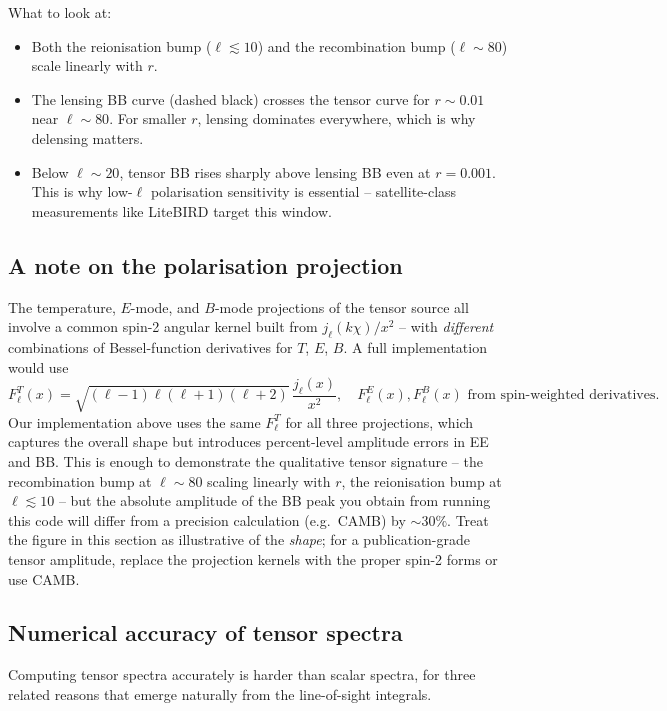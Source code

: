 What to look at:
\begin{itemize}
  \item Both the reionisation bump ($\ell \lesssim 10$) and the recombination bump ($\ell \sim 80$) scale linearly with $r$.
  \item The lensing BB curve (dashed black) crosses the tensor curve for $r \sim 0.01$ near $\ell \sim 80$. For smaller $r$, lensing dominates everywhere, which is why delensing matters.
  \item Below $\ell \sim 20$, tensor BB rises sharply above lensing BB even at $r = 0.001$. This is why low-$\ell$ polarisation sensitivity is essential -- satellite-class measurements like LiteBIRD target this window.
\end{itemize}

\subsection{A note on the polarisation projection}

The temperature, $E$-mode, and $B$-mode projections of the tensor source all involve a common spin-2 angular kernel built from $j_\ell(k\chi)/x^2$ -- with \emph{different} combinations of Bessel-function derivatives for $T$, $E$, $B$. A full implementation would use
\[
  F^T_\ell(x) = \sqrt{(\ell - 1)\ell(\ell + 1)(\ell + 2)}\,\frac{j_\ell(x)}{x^2},
  \quad
  F^E_\ell(x), F^B_\ell(x) \text{ from spin-weighted derivatives.}
\]
Our implementation above uses the same $F^T_\ell$ for all three projections, which captures the overall shape but introduces percent-level amplitude errors in EE and BB. This is enough to demonstrate the qualitative tensor signature -- the recombination bump at $\ell \sim 80$ scaling linearly with $r$, the reionisation bump at $\ell \lesssim 10$ -- but the absolute amplitude of the BB peak you obtain from running this code will differ from a precision calculation (e.g.\ CAMB) by $\sim 30\%$. Treat the figure in this section as illustrative of the \emph{shape}; for a publication-grade tensor amplitude, replace the projection kernels with the proper spin-2 forms or use CAMB.

\subsection{Numerical accuracy of tensor spectra}

Computing tensor spectra accurately is harder than scalar spectra, for three related reasons that emerge naturally from the line-of-sight integrals.

